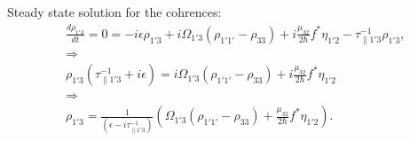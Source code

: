 \documentclass[10pt,letterpaper]{article}
\begin{document}
	\noindent
	Steady state solution for the cohrences:
	\begin{align}
	&\frac{d \rho_{1'3}}{d t}  = 0 =  -i\epsilon\rho_{1'3} +i \Omega_{1'3}(\rho_{1'1'} - \rho_{33}) +i\frac{\mu_{32}}{2 \hbar}f^*\eta_{1'2}-\tau_{\parallel 1'3}^{-1} \rho_{1'3},  \\
	&\Rightarrow \nonumber \\
	&\rho_{1'3} (\tau_{\parallel 1'3}^{-1}+i\epsilon) = i \Omega_{1'3}(\rho_{1'1'} - \rho_{33}) +i\frac{\mu_{32}}{2 \hbar}f^*\eta_{1'2} \\
	&\Rightarrow \nonumber \\
	&\rho_{1'3}  =\frac{1}{(\epsilon-i\tau_{\parallel 1'3}^{-1})} \left( \Omega_{1'3}(\rho_{1'1'} - \rho_{33}) +\frac{\mu_{32}}{2 \hbar}f^*\eta_{1'2} \right).
	\end{align}
	
\end{document}
